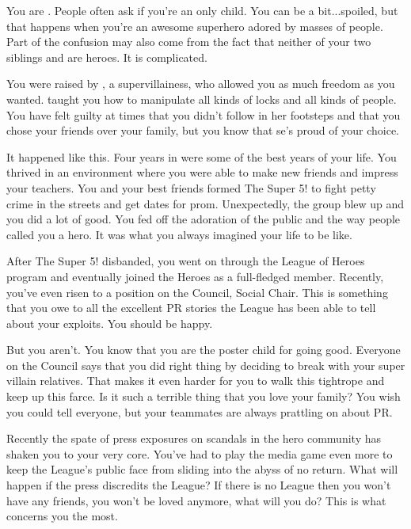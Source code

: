\documentclass[char]{LRSguildcamp1}
\begin{document}
\name{\cYoungest{}}

You are \cYoungest{\MYsupername}. People often ask if you're an only child. You can be a bit...spoiled, but that happens when you're an awesome superhero adored by masses of people. Part of the confusion may also come from the fact that neither of your two siblings \cOldest{} and \cArchitect{} are heroes. It is complicated.  

You were raised by \cGrandma{\MYsupername}, a supervillainess, who allowed you as much freedom as you wanted. \cGrandma{} taught you how to manipulate all kinds of locks and all kinds of people. You have felt guilty at times that you didn't follow in her footsteps and that you chose your friends over your family, but you know that se's proud of your choice. 

It happened like this. Four years in \pSuperSchool{} were some of the best years of your life. You thrived in an environment where you were able to make new friends and impress your teachers. You and your best friends formed The Super 5! to fight petty crime in the streets and get dates for prom. Unexpectedly, the group blew up and you did a lot of good. You fed off the adoration of the public and the way people called you a hero. It was what you always imagined your life to be like.  
 
After The Super 5! disbanded, you went on through the League of Heroes program and eventually joined the Heroes as a full-fledged member. Recently, you've even risen to a position on the Council, Social Chair. This is something that you owe to all the excellent PR stories the League has been able to tell about your exploits. You should be happy. 

But you aren't. You know that you are the poster child for going good. Everyone on the Council says that you did right thing by deciding to break with your super villain relatives. That makes it even harder for you to walk this tightrope and keep up this farce. Is it such a terrible thing that you love your family? 
You wish you could tell everyone, but your teammates are always prattling on about PR. 

Recently the spate of press exposures on scandals in the hero community has shaken you to your very core. You've had to play the media game even more to keep the League's public face from sliding into the abyss of no return. What will happen if the press discredits the League? If there is no League then you won't have any friends, you won't be loved anymore, what will you do? This is what concerns you the most. 
\end{document}
